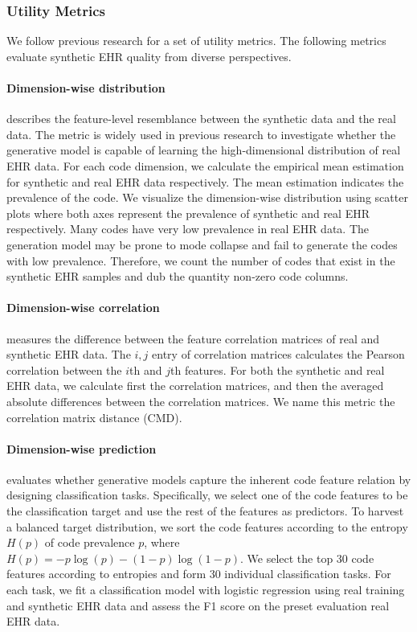 \subsubsection{Utility Metrics}

We follow previous research for a set of utility metrics. The following metrics evaluate synthetic EHR quality from diverse perspectives.

\paragraph{Dimension-wise distribution} describes the feature-level resemblance between the synthetic data and the real data. 
The metric is widely used in previous research to investigate whether the generative model is capable of learning the high-dimensional distribution of real EHR data. 
For each code dimension, we calculate the empirical mean estimation for synthetic and real EHR data respectively. The mean estimation indicates the prevalence of the code. We visualize the dimension-wise distribution using scatter plots where both axes represent the prevalence of synthetic and real EHR respectively. 
Many codes have very low prevalence in real EHR data. The generation model may be prone to mode collapse and fail to generate the codes with low prevalence. Therefore, we count the number of codes that exist in the synthetic EHR samples and dub the quantity non-zero code columns.

\paragraph{Dimension-wise correlation} measures the difference between the feature correlation matrices of real and synthetic EHR data. The $i,j$ entry of correlation matrices calculates the Pearson correlation between the $i$th and $j$th features. For both the synthetic and real EHR data, we calculate first the correlation matrices, and then the averaged absolute differences between the correlation matrices. We name this metric the correlation matrix distance (CMD).

\paragraph{Dimension-wise prediction} evaluates whether generative models capture the inherent code feature relation by designing classification tasks. Specifically, we select one of the code features to be the classification target and use the rest of the features as predictors. To harvest a balanced target distribution, we sort the code features according to the entropy $H(p)$ of code prevalence $p$, where $H(p)=-p\log(p) -(1-p)\log(1-p)$. We select the top 30 code features according to entropies and form 30 individual classification tasks. For each task, we fit a classification model with logistic regression using real training and synthetic EHR data and assess the F1 score on the preset evaluation real EHR data. 

